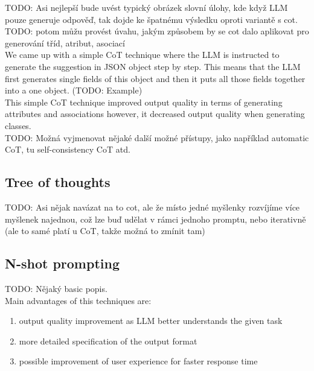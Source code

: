 TODO: Asi nejlepší bude uvést typický obrázek slovní úlohy, kde když LLM pouze generuje odpověď, tak dojde ke špatnému výsledku oproti variantě s cot. \\

TODO: potom můžu provést úvahu, jakým způsobem by se cot dalo aplikovat pro generování tříd, atribut, asociací \\

We came up with a simple CoT technique where the LLM is instructed to generate the  suggestion in JSON object step by step. This means that the LLM first generates single fields of this object and then it puts all those fields together into a one object. (TODO: Example) \\

This simple CoT technique improved output quality in terms of generating attributes and associations however, it decreased output quality when generating classes. \\

TODO: Možná vyjmenovat nějaké další možné přístupy, jako například automatic CoT, tu self-consistency CoT atd. \\


\subsection{Tree of thoughts}

TODO: Asi nějak navázat na to cot, ale že místo jedné myšlenky rozvíjíme více myšlenek najednou, což lze buď udělat v rámci jednoho promptu, nebo iterativně (ale to samé platí u CoT, takže možná to zmínit tam)


\subsection{N-shot prompting}

TODO: Nějaký basic popis. \\

Main advantages of this techniques are:

\begin{enumerate}
\item output quality improvement as LLM better understands the given task
\item more detailed specification of the output format
\item possible improvement of user experience for faster response time
\end{enumerate}

